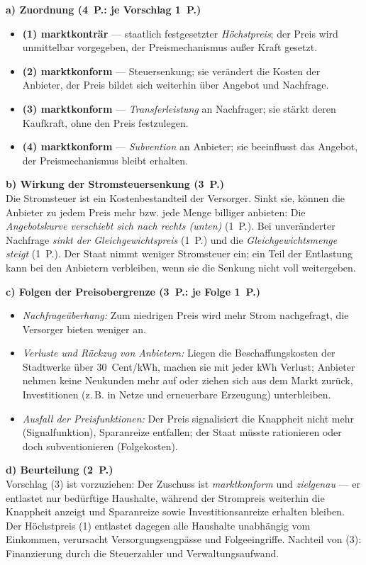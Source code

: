 \begin{loesung}[title={Lösung Aufgabe~2.5 --- Marktkonforme und marktkonträre Eingriffe}]
\textbf{a) Zuordnung (4~P.: je Vorschlag 1~P.)}
\begin{itemize}
  \item \textbf{(1) marktkonträr} --- staatlich festgesetzter \emph{Höchstpreis}; der
    Preis wird unmittelbar vorgegeben, der Preismechanismus außer Kraft gesetzt.
  \item \textbf{(2) marktkonform} --- Steuersenkung; sie verändert die Kosten der
    Anbieter, der Preis bildet sich weiterhin über Angebot und Nachfrage.
  \item \textbf{(3) marktkonform} --- \emph{Transferleistung} an Nachfrager; sie stärkt
    deren Kaufkraft, ohne den Preis festzulegen.
  \item \textbf{(4) marktkonform} --- \emph{Subvention} an Anbieter; sie beeinflusst das
    Angebot, der Preismechanismus bleibt erhalten.
\end{itemize}

\textbf{b) Wirkung der Stromsteuersenkung (3~P.)}\\
Die Stromsteuer ist ein Kostenbestandteil der Versorger. Sinkt sie, können die Anbieter
zu jedem Preis mehr bzw. jede Menge billiger anbieten: Die \emph{Angebotskurve verschiebt
sich nach rechts (unten)} (1~P.). Bei unveränderter Nachfrage \emph{sinkt der
Gleichgewichtspreis} (1~P.) und die \emph{Gleichgewichtsmenge steigt} (1~P.). Der Staat
nimmt weniger Stromsteuer ein; ein Teil der Entlastung kann bei den Anbietern verbleiben,
wenn sie die Senkung nicht voll weitergeben.

\textbf{c) Folgen der Preisobergrenze (3~P.: je Folge 1~P.)}
\begin{itemize}
  \item \emph{Nachfrageüberhang:} Zum niedrigen Preis wird mehr Strom nachgefragt, die
    Versorger bieten weniger an.
  \item \emph{Verluste und Rückzug von Anbietern:} Liegen die Beschaffungskosten der
    Stadtwerke über 30~Cent/kWh, machen sie mit jeder kWh Verlust; Anbieter nehmen keine
    Neukunden mehr auf oder ziehen sich aus dem Markt zurück, Investitionen (z.\,B. in
    Netze und erneuerbare Erzeugung) unterbleiben.
  \item \emph{Ausfall der Preisfunktionen:} Der Preis signalisiert die Knappheit nicht
    mehr (Signalfunktion), Sparanreize entfallen; der Staat müsste rationieren oder doch
    subventionieren (Folgekosten).
\end{itemize}

\textbf{d) Beurteilung (2~P.)}\\
Vorschlag (3) ist vorzuziehen: Der Zuschuss ist \emph{marktkonform} und
\emph{zielgenau} --- er entlastet nur bedürftige Haushalte, während der Strompreis
weiterhin die Knappheit anzeigt und Sparanreize sowie Investitionsanreize erhalten
bleiben. Der Höchstpreis (1) entlastet dagegen alle Haushalte unabhängig vom Einkommen,
verursacht Versorgungsengpässe und Folgeeingriffe. Nachteil von (3): Finanzierung durch
die Steuerzahler und Verwaltungsaufwand.
\end{loesung}

